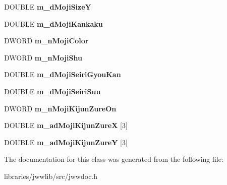 \begin{DoxyCompactItemize}
\item 
\hypertarget{classJWWHead_a832cc00f2ec30c34b35ae53a9db4bb41}{D\-O\-U\-B\-L\-E {\bfseries m\-\_\-d\-Moji\-Size\-Y}}\label{classJWWHead_a832cc00f2ec30c34b35ae53a9db4bb41}

\item 
\hypertarget{classJWWHead_a7b97c8bf35f8c9c96800a64e4de2d6ee}{D\-O\-U\-B\-L\-E {\bfseries m\-\_\-d\-Moji\-Kankaku}}\label{classJWWHead_a7b97c8bf35f8c9c96800a64e4de2d6ee}

\item 
\hypertarget{classJWWHead_a6603866f0a01784ecbe8deb5f9dfdf4f}{D\-W\-O\-R\-D {\bfseries m\-\_\-n\-Moji\-Color}}\label{classJWWHead_a6603866f0a01784ecbe8deb5f9dfdf4f}

\item 
\hypertarget{classJWWHead_a87cdf97f415597e22a87b0bfa88dabb0}{D\-W\-O\-R\-D {\bfseries m\-\_\-n\-Moji\-Shu}}\label{classJWWHead_a87cdf97f415597e22a87b0bfa88dabb0}

\item 
\hypertarget{classJWWHead_a4a38283382e08e8e4b80f6eb72049a4f}{D\-O\-U\-B\-L\-E {\bfseries m\-\_\-d\-Moji\-Seiri\-Gyou\-Kan}}\label{classJWWHead_a4a38283382e08e8e4b80f6eb72049a4f}

\item 
\hypertarget{classJWWHead_ad81310b15bd6f8bddc724efc234bffa0}{D\-O\-U\-B\-L\-E {\bfseries m\-\_\-d\-Moji\-Seiri\-Suu}}\label{classJWWHead_ad81310b15bd6f8bddc724efc234bffa0}

\item 
\hypertarget{classJWWHead_a7d5b4fdc22bc92e9884ae5d7d4657a40}{D\-W\-O\-R\-D {\bfseries m\-\_\-n\-Moji\-Kijun\-Zure\-On}}\label{classJWWHead_a7d5b4fdc22bc92e9884ae5d7d4657a40}

\item 
\hypertarget{classJWWHead_acb7e52f9b24c64c43379977fef105064}{D\-O\-U\-B\-L\-E {\bfseries m\-\_\-ad\-Moji\-Kijun\-Zure\-X} \mbox{[}3\mbox{]}}\label{classJWWHead_acb7e52f9b24c64c43379977fef105064}

\item 
\hypertarget{classJWWHead_ad0a22d5cf897176d748ecc942b8a966b}{D\-O\-U\-B\-L\-E {\bfseries m\-\_\-ad\-Moji\-Kijun\-Zure\-Y} \mbox{[}3\mbox{]}}\label{classJWWHead_ad0a22d5cf897176d748ecc942b8a966b}

\end{DoxyCompactItemize}


The documentation for this class was generated from the following file\-:\begin{DoxyCompactItemize}
\item 
libraries/jwwlib/src/jwwdoc.\-h\end{DoxyCompactItemize}
